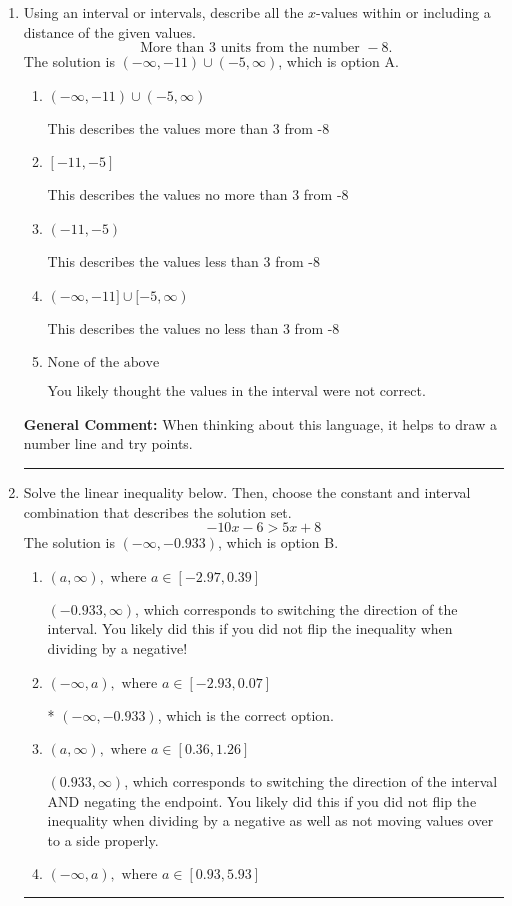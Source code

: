\documentclass{extbook}[14pt]
\newcommand{\litem}[1]{\item #1

\rule{\textwidth}{0.4pt}}
\begin{document}
\begin{enumerate}\litem{
Using an interval or intervals, describe all the $x$-values within or including a distance of the given values.
\[ \text{ More than } 3 \text{ units from the number } -8. \]The solution is \( (-\infty, -11) \cup (-5, \infty) \), which is option A.\begin{enumerate}[label=\Alph*.]
\item \( (-\infty, -11) \cup (-5, \infty) \)

This describes the values more than 3 from -8
\item \( [-11, -5] \)

This describes the values no more than 3 from -8
\item \( (-11, -5) \)

This describes the values less than 3 from -8
\item \( (-\infty, -11] \cup [-5, \infty) \)

This describes the values no less than 3 from -8
\item \( \text{None of the above} \)

You likely thought the values in the interval were not correct.
\end{enumerate}

\textbf{General Comment:} When thinking about this language, it helps to draw a number line and try points.
}
\litem{
Solve the linear inequality below. Then, choose the constant and interval combination that describes the solution set.
\[ -10x -6 > 5x + 8 \]The solution is \( (-\infty, -0.933) \), which is option B.\begin{enumerate}[label=\Alph*.]
\item \( (a, \infty), \text{ where } a \in [-2.97, 0.39] \)

 $(-0.933, \infty)$, which corresponds to switching the direction of the interval. You likely did this if you did not flip the inequality when dividing by a negative!
\item \( (-\infty, a), \text{ where } a \in [-2.93, 0.07] \)

* $(-\infty, -0.933)$, which is the correct option.
\item \( (a, \infty), \text{ where } a \in [0.36, 1.26] \)

 $(0.933, \infty)$, which corresponds to switching the direction of the interval AND negating the endpoint. You likely did this if you did not flip the inequality when dividing by a negative as well as not moving values over to a side properly.
\item \( (-\infty, a), \text{ where } a \in [0.93, 5.93] \)


\end{enumerate}}
\end{enumerate}
\end{document}
